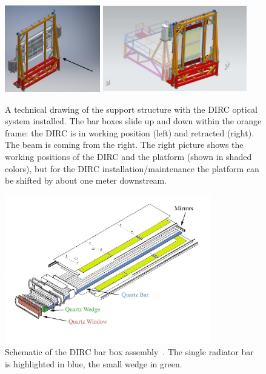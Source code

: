 \begin{figure}[!h]
\includegraphics[width=0.37\textwidth]{pics/support.png} \hspace{0.2cm}
\includegraphics[width=0.56\textwidth]{pics/Full_Assy_Iso-retracted.pdf}
\caption{\label{pic:support} A technical drawing of the support structure with the DIRC optical system installed. 
The bar boxes slide up and down within the orange frame: the DIRC is in working position (left) and retracted (right). 
The beam is coming from the right. The right picture shows the working positions of the DIRC and the platform (shown in shaded colors), but for the DIRC installation/maintenance the platform can be shifted by about one meter downstream.}
\end{figure}

\begin{figure}[!h]
\centering
\includegraphics[width=0.8\textwidth]{pics/bab_col.jpg}
\caption{\label{pic:bbox} Schematic of the \babar DIRC bar box assembly~\cite{bdirc1}. The single radiator bar is highlighted in blue, the small wedge in green.}
\end{figure}

